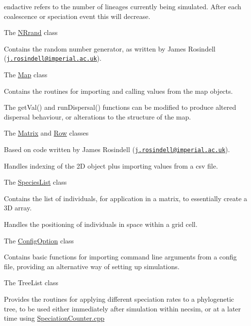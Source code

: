 \begin{DoxyItemize}
\begin{DoxyItemize}
\item {\ttfamily endactive} refers to the number of lineages currently being simulated. After each coalescence or speciation event this will decrease.
\end{DoxyItemize}
\item The {\ttfamily \hyperlink{class_n_rrand}{N\+Rrand}} class
\begin{DoxyItemize}
\item Contains the random number generator, as written by James Rosindell (\href{mailto:j.rosindell@imperial.ac.uk}{\tt j.\+rosindell@imperial.\+ac.\+uk}).
\end{DoxyItemize}
\item The {\ttfamily \hyperlink{class_map}{Map}} class
\begin{DoxyItemize}
\item Contains the routines for importing and calling values from the map objects.
\item The {\ttfamily get\+Val()} and {\ttfamily run\+Dispersal()} functions can be modified to produce altered dispersal behaviour, or alterations to the structure of the map.
\end{DoxyItemize}
\item The {\ttfamily \hyperlink{class_matrix}{Matrix}} and {\ttfamily \hyperlink{class_row}{Row}} classes
\begin{DoxyItemize}
\item Based on code written by James Rosindell (\href{mailto:j.rosindell@imperial.ac.uk}{\tt j.\+rosindell@imperial.\+ac.\+uk}).
\item Handles indexing of the 2D object plus importing values from a csv file.
\end{DoxyItemize}
\item The {\ttfamily \hyperlink{class_species_list}{Species\+List}} class
\begin{DoxyItemize}
\item Contains the list of individuals, for application in a matrix, to essentially create a 3D array.
\item Handles the positioning of individuals in space within a grid cell.
\end{DoxyItemize}
\item The {\ttfamily \hyperlink{class_config_option}{Config\+Option}} class
\begin{DoxyItemize}
\item Contains basic functions for importing command line arguments from a config file, providing an alternative way of setting up simulations.
\end{DoxyItemize}
\item The {\ttfamily Tree\+List} class
\begin{DoxyItemize}
\item Provides the routines for applying different speciation rates to a phylogenetic tree, to be used either immediately after simulation within necsim, or at a later time using \hyperlink{_speciation_counter_8cpp}{Speciation\+Counter.\+cpp}
\end{DoxyItemize}
\end{DoxyItemize}

